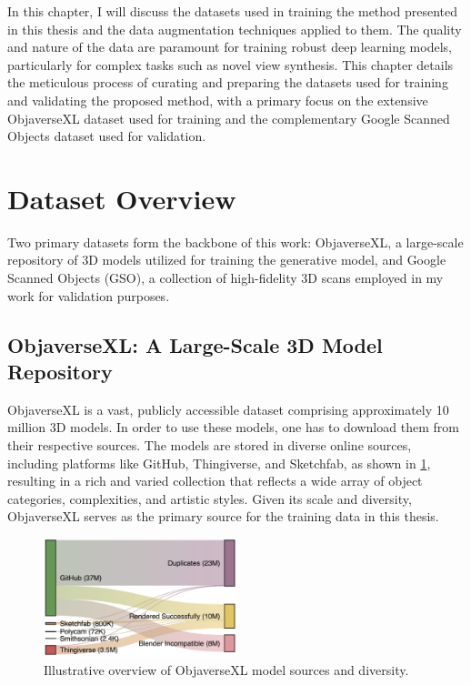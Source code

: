 \label{chapter:data-preparation}

In this chapter, I will discuss the datasets used in training the method presented in this thesis and the data augmentation techniques applied to them.
The quality and nature of the data are paramount for training robust deep learning models, particularly for complex tasks such as novel view synthesis. This chapter details the meticulous process of curating and preparing the datasets used for training and validating the proposed method, with a primary focus on the extensive ObjaverseXL dataset used for training and the complementary Google Scanned Objects dataset used for validation.

\section{Dataset Overview}\label{sec:dataset-overview}

Two primary datasets form the backbone of this work: ObjaverseXL, a large-scale repository of 3D models utilized for training the generative model, and Google Scanned Objects (GSO), a collection of high-fidelity 3D scans employed in my work for validation purposes.

\subsection{ObjaverseXL: A Large-Scale 3D Model Repository}\label{ssec:objaversexl-overview}
ObjaverseXL \cite{objaversexl} is a vast, publicly accessible dataset comprising approximately 10 million 3D models. In order to use these models, one has to download them from their respective sources. The models are stored in diverse online sources, including platforms like GitHub, Thingiverse, and Sketchfab, as shown in \ref{fig:objaversexl-overview}, resulting in a rich and varied collection that reflects a wide array of object categories, complexities, and artistic styles. Given its scale and diversity, ObjaverseXL serves as the primary source for the training data in this thesis.

\begin{figure}[h]
  \centering
  \includegraphics[width=0.5\textwidth]{images/data/sankey-diagram-objaverse-sources.jpeg}
  \caption{Illustrative overview of ObjaverseXL model sources and diversity.}
  \label{fig:objaversexl-overview}
\end{figure}

